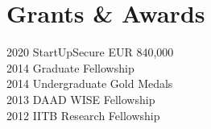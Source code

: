 \documentclass[]{deedy-resume-openfont}
\begin{document}
\begin{minipage}[t]{0.30\textwidth}

\section{Grants \& Awards}
2020 \textbullet{}  StartUpSecure EUR 840,000 \\
2014 \textbullet{}  Graduate Fellowship \\
2014 \textbullet{}  Undergraduate Gold Medals \\
2013 \textbullet{}  DAAD WISE Fellowship \\
2012 \textbullet{}  IITB Research Fellowship
\sectionsep

%
%

\end{minipage} 
\hfill
\end{document}
